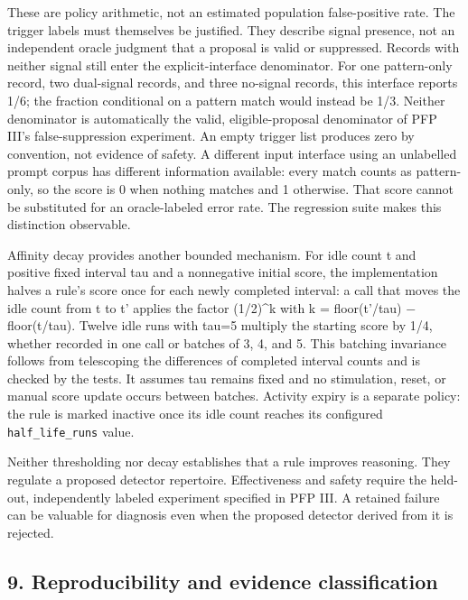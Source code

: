 \documentclass[
  11pt,
]{article}
\begin{document}
These are policy arithmetic, not an estimated population false-positive
rate. The trigger labels must themselves be justified. They describe
signal presence, not an independent oracle judgment that a proposal is
valid or suppressed. Records with neither signal still enter the
explicit-interface denominator. For one pattern-only record, two
dual-signal records, and three no-signal records, this interface reports
1/6; the fraction conditional on a pattern match would instead be 1/3.
Neither denominator is automatically the valid, eligible-proposal
denominator of PFP III's false-suppression experiment. An empty trigger
list produces zero by convention, not evidence of safety. A different
input interface using an unlabelled prompt corpus has different
information available: every match counts as pattern-only, so the score
is 0 when nothing matches and 1 otherwise. That score cannot be
substituted for an oracle-labeled error rate. The regression suite makes
this distinction observable.

Affinity decay provides another bounded mechanism. For idle count t and
positive fixed interval tau and a nonnegative initial score, the
implementation halves a rule's score once for each newly completed
interval: a call that moves the idle count from t to t' applies the
factor (1/2)\^{}k with k = floor(t'/tau) − floor(t/tau). Twelve idle
runs with tau=5 multiply the starting score by 1/4, whether recorded in
one call or batches of 3, 4, and 5. This batching invariance follows
from telescoping the differences of completed interval counts and is
checked by the tests. It assumes tau remains fixed and no stimulation,
reset, or manual score update occurs between batches. Activity expiry is
a separate policy: the rule is marked inactive once its idle count
reaches its configured \texttt{\nolinkurl{half_life_runs}} value.

Neither thresholding nor decay establishes that a rule improves
reasoning. They regulate a proposed detector repertoire. Effectiveness
and safety require the held-out, independently labeled experiment
specified in PFP III. A retained failure can be valuable for diagnosis
even when the proposed detector derived from it is rejected.

\hypertarget{reproducibility-and-evidence-classification}{%
\subsection{9. Reproducibility and evidence
classification}\label{reproducibility-and-evidence-classification}}
\end{document}
